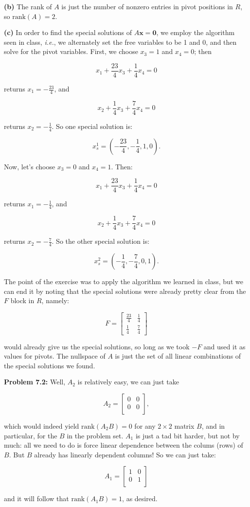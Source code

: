 \documentclass{article}
\begin{document}
\textbf{(b)} The rank of $A$ is just the number of nonzero entries in pivot positions in $R$, so $\text{rank}(A) = 2$.

\textbf{(c)} In order to find the special solutions of $A\mathbf{x = 0}$, we employ the algorithm seen in class, \textit{i.e.}, we alternately set the free variables to be 1 and 0, and then solve for the pivot variables. First, we choose $x_3 = 1$ and $x_4 = 0$; then

\[
x_1 + \frac{23}{4}x_3 + \frac{1}{4}x_4 = 0
\]

returns $x_1 = -\frac{23}{4}$, and

\[
x_2 + \frac{1}{4}x_3 + \frac{7}{4}x_4 = 0
\]

returns $x_2 = -\frac{1}{4}$. So one special solution is:

\[
x_{s}^{1} = \left(-\frac{23}{4}, -\frac{1}{4}, 1, 0\right).
\]

Now, let's choose $x_3 = 0$ and $x_4 = 1$. Then:

\[
x_1 + \frac{23}{4}x_3 + \frac{1}{4}x_4 = 0
\]

returns $x_1 = -\frac{1}{4}$, and

\[
x_2 + \frac{1}{4}x_3 + \frac{7}{4}x_4 = 0
\]

returns $x_2 = -\frac{7}{4}$. So the other special solution is:

\[
x_{s}^{2} = \left(-\frac{1}{4}, -\frac{7}{4}, 0, 1\right).
\]

The point of the exercise was to apply the algorithm we learned in class, but we can end it by noting that the special solutions were already pretty clear from the $F$ block in $R$, namely:

\[
F = \begin{bmatrix}
\frac{23}{4} & \frac{1}{4}\\
\frac{1}{4} & \frac{7}{4}
\end{bmatrix}
\]

would already give us the special solutions, so long as we took $-F$ and used it as values for pivots. The nullspace of $A$ is just the set of all linear combinations of the special solutions we found.

\noindent \textbf{Problem 7.2:} Well, $A_2$ is relatively easy, we can just take

\[
A_2 = \begin{bmatrix}
0 & 0\\
0 & 0\\
\end{bmatrix},
\]

which would indeed yield $\text{rank}(A_2B) = 0$ for any $2 \times 2$ matrix $B$, and in particular, for the $B$ in the problem set. $A_1$ is just a tad bit harder, but not by much: all we need to do is force linear dependence between the colums (rows) of $B$. But $B$ already has linearly dependent columns! So we can just take:

\[
A_1 = \begin{bmatrix}
1 & 0\\
0 & 1\\
\end{bmatrix}
\]

and it will follow that $\text{rank}(A_1B) = 1$, as desired.
\end{document}
